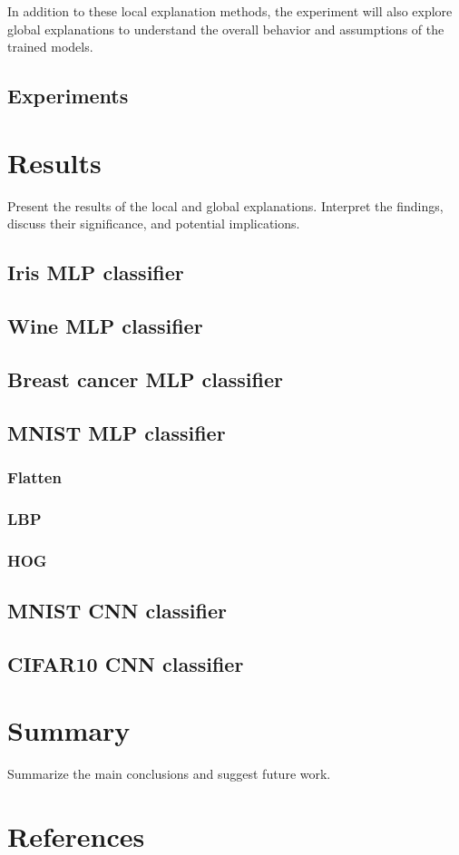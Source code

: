\documentclass[conference]{IEEEtran}
\begin{document}
    In addition to these local explanation methods, the experiment will also explore global explanations to understand the overall behavior and assumptions of the trained models.

\subsection{Experiments}\label{subsec:experiments}

\section{Results}\label{sec:results}
    Present the results of the local and global explanations.
    Interpret the findings, discuss their significance, and potential implications.

\subsection{Iris MLP classifier}\label{subsec:experiment-iris}
\subsection{Wine MLP classifier}\label{subsec:experiment-wine}
\subsection{Breast cancer MLP classifier}\label{subsec:experiment-cancer}

\subsection{MNIST MLP classifier}\label{subsec:experiment-mnist-mlp}

\subsubsection{Flatten}
\subsubsection{LBP}
\subsubsection{HOG}

\subsection{MNIST CNN classifier}\label{subsec:experiment-mnist-cnn}
\subsection{CIFAR10 CNN classifier}\label{subsec:experiment-cifar}

\section{Summary}\label{sec:summary}
    Summarize the main conclusions and suggest future work.

\section{References}\label{sec:references}

    
    
\end{document}
